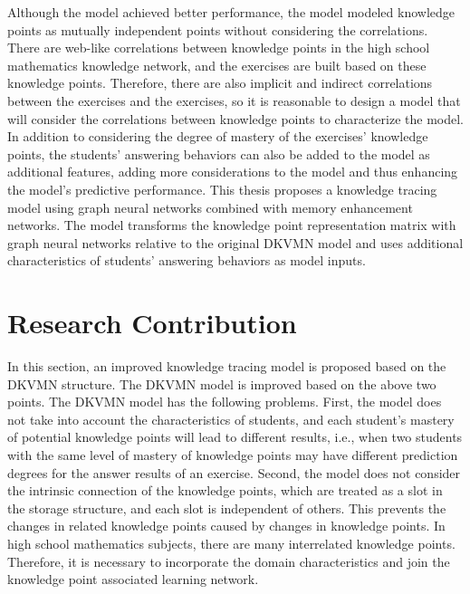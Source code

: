 Although the model achieved better performance, the model modeled knowledge points as mutually independent points without considering the correlations. There are web-like correlations between knowledge points in the high school mathematics knowledge network, and the exercises are built based on these knowledge points. Therefore, there are also implicit and indirect correlations between the exercises and the exercises, so it is reasonable to design a model that will consider the correlations between knowledge points to characterize the model. In addition to considering the degree of mastery of the exercises' knowledge points, the students' answering behaviors can also be added to the model as additional features, adding more considerations to the model and thus enhancing the model's predictive performance. This thesis proposes a knowledge tracing model using graph neural networks combined with memory enhancement networks. The model transforms the knowledge point representation matrix with graph neural networks relative to the original DKVMN model and uses additional characteristics of students' answering behaviors as model inputs.

\section{Research Contribution}
In this section, an improved knowledge tracing model is proposed based on the DKVMN structure. The DKVMN model is improved based on the above two points. The DKVMN model has the following problems. First, the model does not take into account the characteristics of students, and each student's mastery of potential knowledge points will lead to different results, i.e., when two students with the same level of mastery of knowledge points may have different prediction degrees for the answer results of an exercise. Second, the model does not consider the intrinsic connection of the knowledge points, which are treated as a slot in the storage structure, and each slot is independent of others. This prevents the changes in related knowledge points caused by changes in knowledge points. In high school mathematics subjects, there are many interrelated knowledge points. Therefore, it is necessary to incorporate the domain characteristics and join the knowledge point associated learning network.


